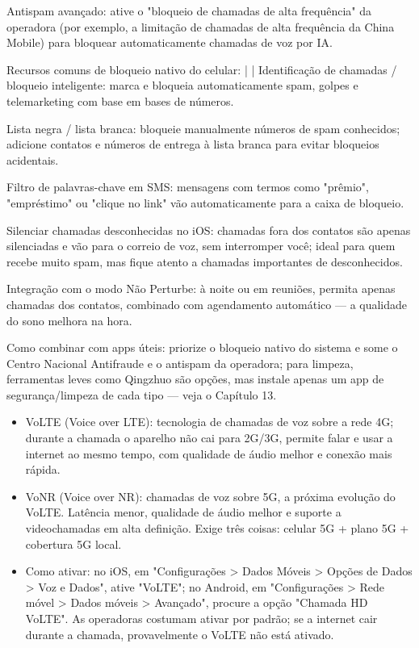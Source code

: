 Antispam avançado: ative o "bloqueio de chamadas de alta frequência" da operadora (por exemplo, a limitação de chamadas de alta frequência da China Mobile) para bloquear automaticamente chamadas de voz por IA.

Recursos comuns de bloqueio nativo do celular: | | Identificação de chamadas / bloqueio inteligente: marca e bloqueia automaticamente spam, golpes e telemarketing com base em bases de números.

Lista negra / lista branca: bloqueie manualmente números de spam conhecidos; adicione contatos e números de entrega à lista branca para evitar bloqueios acidentais.

Filtro de palavras-chave em SMS: mensagens com termos como "prêmio", "empréstimo" ou "clique no link" vão automaticamente para a caixa de bloqueio.

Silenciar chamadas desconhecidas no iOS: chamadas fora dos contatos são apenas silenciadas e vão para o correio de voz, sem interromper você; ideal para quem recebe muito spam, mas fique atento a chamadas importantes de desconhecidos.

Integração com o modo Não Perturbe: à noite ou em reuniões, permita apenas chamadas dos contatos, combinado com agendamento automático — a qualidade do sono melhora na hora.

Como combinar com apps úteis: priorize o bloqueio nativo do sistema e some o Centro Nacional Antifraude e o antispam da operadora; para limpeza, ferramentas leves como Qingzhuo são opções, mas instale apenas um app de segurança/limpeza de cada tipo — veja o Capítulo 13.


\begin{itemize}
  \item VoLTE (Voice over LTE): tecnologia de chamadas de voz sobre a rede 4G; durante a chamada o aparelho não cai para 2G/3G, permite falar e usar a internet ao mesmo tempo, com qualidade de áudio melhor e conexão mais rápida.
  \item VoNR (Voice over NR): chamadas de voz sobre 5G, a próxima evolução do VoLTE. Latência menor, qualidade de áudio melhor e suporte a videochamadas em alta definição. Exige três coisas: celular 5G + plano 5G + cobertura 5G local.
  \item Como ativar: no iOS, em "Configurações > Dados Móveis > Opções de Dados > Voz e Dados", ative "VoLTE"; no Android, em "Configurações > Rede móvel > Dados móveis > Avançado", procure a opção "Chamada HD VoLTE". As operadoras costumam ativar por padrão; se a internet cair durante a chamada, provavelmente o VoLTE não está ativado.
\end{itemize}

